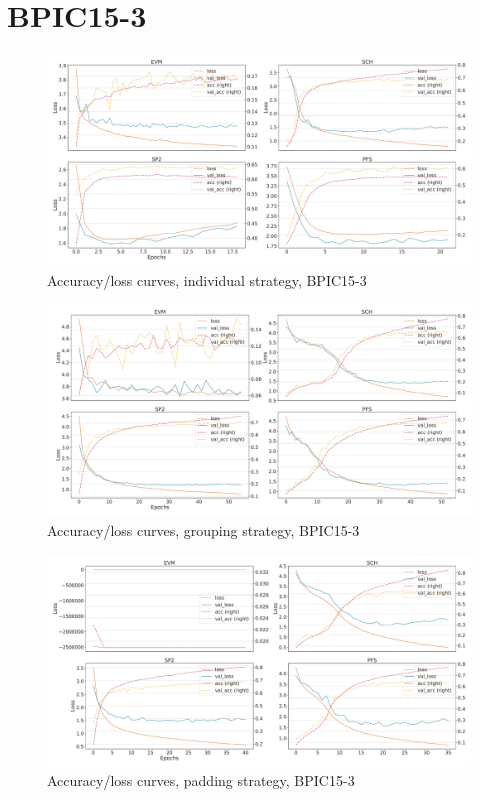 \section*{BPIC15-3}
\begin{figure}[!htb]
    \centering
    \includegraphics[width=\textwidth]{gfx/bpic2015_3/individual_loss_acc_curve.pdf}
    \caption{Accuracy/loss curves, individual strategy, BPIC15-3}
\end{figure}
\begin{figure}[!htb]
    \centering
    \includegraphics[width=\textwidth]{gfx/bpic2015_3/grouped_loss_acc_curve.pdf}
    \caption{Accuracy/loss curves, grouping strategy, BPIC15-3}
\end{figure}
\begin{figure}[!htb]
    \centering
    \includegraphics[width=\textwidth]{gfx/bpic2015_3/padded_loss_acc_curve.pdf}
    \caption{Accuracy/loss curves, padding strategy, BPIC15-3}
\end{figure}
